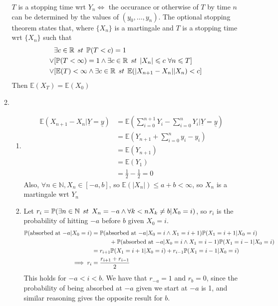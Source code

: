 \documentclass{article}
\begin{document}
\begin{enumerate}
\begin{enumerate}
$T$ is a stopping time wrt ${Y_n}\iff$ the occurance or otherwise of $T$ by time $n$ can be determined by the values of $(y_0,\dots,y_n)$. The optional stopping theorem states that, where $\{X_n\}$ is a martingale and $T$ is a stopping time wrt $\{X_n\}$ such that
\begin{align*}
&\exists c \in \mathbb{R} \,\; st \,\; \mathbb{P}(T<c) = 1\\
\vee &[ \mathbb{P} (T< \infty) =1 \wedge \exists c \in \mathbb{R} \,\; st \,\; |X_n| \leqslant c \,\,\forall n \leqslant T]\\
\vee &[\mathbb{E}(T) < \infty \wedge \exists c \in \mathbb{R} \,\; st \,\; \mathbb{E}(|X_{n+1} - X_n| | X_n) < c]
\end{align*}
Then $ \mathbb{E}(X_T) = \mathbb{E}(X_0)$

\item
\begin{enumerate}
\item
\begin{align*}
\mathbb{E}(X_{n+1} - X_n | \underline{Y} = \underline{y}) 
&= \mathbb{E}\left(\sum^{n+1}_{i=0}Y_i - \sum^n_{i=0}Y_i | \underline{Y} = \underline{y}\right)\\
&= \mathbb{E}\left( Y_{n+1} + \sum^n_{i=0}y_i - y_i\right)\\
&= \mathbb{E}(Y_{n+1})\\
&= \mathbb{E}(Y_1)\\
&= \frac{1}{2} - \frac{1}{2} = 0
\end{align*}
Also, $\forall n \in \mathbb{N}, X_n \in [-a,b]$, so $\mathbb{E}(|X_n|) \leqslant a+b<\infty$, so $X_n$ is a martingale wrt $Y_n$
\item
Let $r_i = \mathbb{P}(\exists n \in \mathbb{N} \,\; st \,\; X_n = -a \wedge \forall k<n X_k \neq b | X_0 = i)$, so $r_i$ is the probability of hitting $-a$ before $b$ given $X_0 = i$.
\begin{align*}
\mathbb{P}(\mbox{absorbed at $-a$}|X_0=i) &= 
\mathbb{P}(\mbox{absorbed at $-a$}|X_0=i \wedge X_1 = i+1)\mathbb{P}(X_1=i+1 | X_0 = i) \\
&\quad\quad\quad+ \mathbb{P}(\mbox{absorbed at $-a$}|X_0=i \wedge X_1 = i-1)\mathbb{P}(X_1=i-1 | X_0 = i)\\
&= r_{i+1}\mathbb{P}(X_1=i+1 | X_0 = i)+r_{i-1}\mathbb{P}(X_1=i-1 | X_0 = i)\\
\implies r_i &= \frac{r_{i+1}+r_{i-1}}{2}
\end{align*}
This holds for $-a < i < b$. We have that $r_{-a} =1$ and $r_b = 0$, since the probability of being absorbed at $-a$ given we start at $-a$ is 1, and similar reasoning gives the opposite result for $b$.

\end{enumerate}
\end{enumerate}
\end{enumerate}
\end{document}
